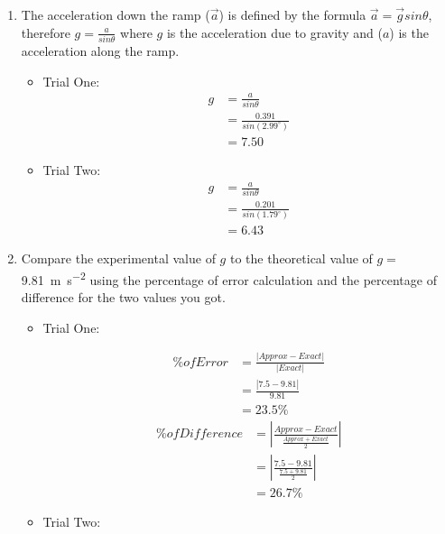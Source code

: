 \documentclass[12pt]{article}
\begin{document}
\begin{enumerate}
\begin{figure}[H]
\begin{minipage}{0.4\textwidth}
        \end{minipage}
    \end{figure}
    \item The acceleration down the ramp ($\vec{a}$) is defined by the formula $\vec{a}=\vec{g}sin\theta$, therefore $g=\frac{a}{sin\theta}$ where $g$ is the acceleration due to gravity and ($a$) is the acceleration along the ramp.
    \begin{itemize}
        \item Trial One:
        \begin{align*}
            g&=\frac{a}{sin\theta}\\
             &=\frac{0.391}{sin(2.99^{\circ})}\\
             &=7.50
        \end{align*}
        \item Trial Two:
        \begin{align*}
            g&=\frac{a}{sin\theta}\\
             &=\frac{0.201}{sin(1.79^{\circ})}\\
             &=6.43
        \end{align*}
    \end{itemize}
    \item Compare the experimental value of $g$ to the theoretical value of $g=$\SI{9.81}{\metre\per\second\squared} using the percentage of error calculation and the percentage of difference for the two values you got.
    \begin{itemize}
        \item Trial One:
        \begin{multicols}{2}
            \begin{align*}
                \% of Error &= \frac{|Approx - Exact|}{|Exact|}\\
                &=\frac{|7.5-9.81|}{9.81}\\
                &=23.5\%
            \end{align*}\break
            \begin{align*}
                \% of Difference &= |\frac{Approx - Exact}{\frac{Approx+Exact}{2}}|\\
                &=|\frac{7.5-9.81}{\frac{7.5+9.81}{2}}|\\
                &=26.7\%
            \end{align*}
        \end{multicols}
        \item Trial Two:

\end{itemize}
\end{enumerate}
\end{document}

